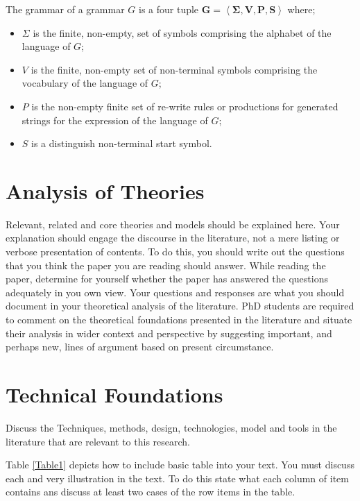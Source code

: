 \begin{definition}[Grammar]
The grammar of a grammar $G$ is a four tuple $\mathbf{G = \left\langle \Sigma, V, P, S \right\rangle}$ where;
\begin{itemize}
\item $\Sigma$ is the finite, non-empty, set of symbols comprising the alphabet of the language of $G$;
\item $V$ is the finite, non-empty set of non-terminal symbols comprising the vocabulary of the language of $G$;
\item $P$ is the non-empty finite set of re-write rules or productions for generated strings for the expression of the language of $G$;
\item $S$ is a distinguish non-terminal start symbol.  
\end{itemize}
\label{Def2}
\end{definition}

		 

\section{Analysis of Theories}

Relevant, related and core theories and models
should be explained here. Your explanation should engage the discourse in the literature, not a mere listing or verbose presentation of contents. To do this, you should write out the questions that you think the paper you are reading should answer. While reading the paper, determine for yourself whether the paper has answered the questions adequately in you own view. Your questions and responses are what you should document in your theoretical analysis of the literature. PhD students are  required to comment on the theoretical foundations presented in the literature and situate their analysis in wider context and perspective by suggesting important, and perhaps new, lines of argument based on present circumstance.

\section{Technical Foundations}

Discuss the Techniques, methods, design, technologies, model and tools in the literature that are relevant to this research.

Table \ref{Table1} depicts how to include basic table into your text. You must discuss each and very illustration in the text. To do this state what each column of item contains ans discuss at least two cases of the row items in the table. 

